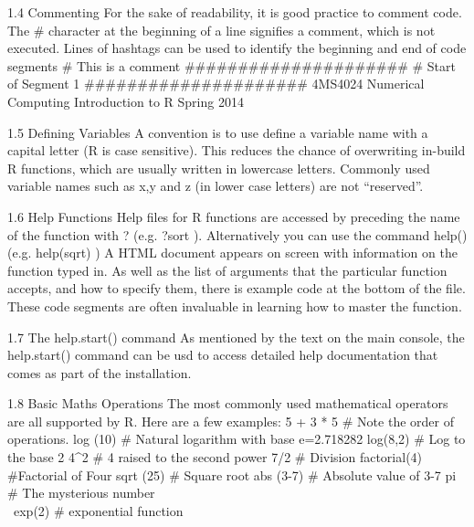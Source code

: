 \documentclass{beamer}
\begin{document}
\begin{frame}
1.4 Commenting
For the sake of readability, it is good practice to comment code. The # character at the
beginning of a line signifies a comment, which is not executed. Lines of hashtags can be used
to identify the beginning and end of code segments
# This is a comment
#####################
# Start of Segment 1
#####################
4MS4024 Numerical Computing Introduction to R Spring 2014
\end{frame}
\begin{frame}
1.5 Defining Variables
A convention is to use define a variable name with a capital letter (R is case sensitive). This
reduces the chance of overwriting in-build R functions, which are usually written in lowercase
letters. Commonly used variable names such as x,y and z (in lower case letters) are not “reserved”.
\end{frame}
\begin{frame}

1.6 Help Functions
Help files for R functions are accessed by preceding the name of the function with ? (e.g. ?sort
). Alternatively you can use the command help() (e.g. help(sqrt) )
A HTML document appears on screen with information on the function typed in. As well
as the list of arguments that the particular function accepts, and how to specify them, there is
example code at the bottom of the file. These code segments are often invaluable in learning
how to master the function.

\end{frame}
\begin{frame}


1.7 The help.start() command
As mentioned by the text on the main console, the help.start() command can be usd to
access detailed help documentation that comes as part of the installation.
\end{frame}
\begin{frame}

1.8 Basic Maths Operations
The most commonly used mathematical operators are all supported by R. Here are a few
examples:
5 + 3 * 5 # Note the order of operations.
log (10) # Natural logarithm with base e=2.718282
log(8,2) # Log to the base 2
4^2 # 4 raised to the second power
7/2 # Division
factorial(4) #Factorial of Four
sqrt (25) # Square root
abs (3-7) # Absolute value of 3-7
pi # The mysterious number \\\
exp(2) # exponential function
\end{frame}
\end{document}

